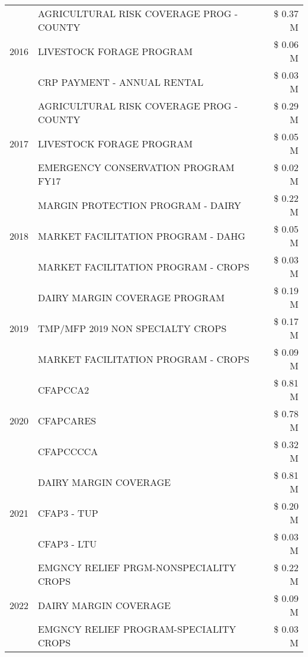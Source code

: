 \begin{tabular}{llr}
\cline{1-3}
\multirow[t]{3}{*}{2016} & AGRICULTURAL RISK COVERAGE PROG - COUNTY & \$ 0.37 M \\
 & LIVESTOCK FORAGE PROGRAM & \$ 0.06 M \\
 & CRP PAYMENT - ANNUAL RENTAL & \$ 0.03 M \\
\cline{1-3}
\multirow[t]{3}{*}{2017} & AGRICULTURAL RISK COVERAGE PROG - COUNTY & \$ 0.29 M \\
 & LIVESTOCK FORAGE PROGRAM & \$ 0.05 M \\
 & EMERGENCY CONSERVATION PROGRAM FY17 & \$ 0.02 M \\
\cline{1-3}
\multirow[t]{3}{*}{2018} & MARGIN PROTECTION PROGRAM - DAIRY & \$ 0.22 M \\
 & MARKET FACILITATION PROGRAM - DAHG & \$ 0.05 M \\
 & MARKET FACILITATION PROGRAM - CROPS & \$ 0.03 M \\
\cline{1-3}
\multirow[t]{3}{*}{2019} & DAIRY MARGIN COVERAGE PROGRAM & \$ 0.19 M \\
 & TMP/MFP 2019 NON SPECIALTY CROPS & \$ 0.17 M \\
 & MARKET FACILITATION PROGRAM - CROPS & \$ 0.09 M \\
\cline{1-3}
\multirow[t]{3}{*}{2020} & CFAPCCA2 & \$ 0.81 M \\
 & CFAPCARES & \$ 0.78 M \\
 & CFAPCCCCA & \$ 0.32 M \\
\cline{1-3}
\multirow[t]{3}{*}{2021} & DAIRY MARGIN COVERAGE & \$ 0.81 M \\
 & CFAP3 - TUP & \$ 0.20 M \\
 & CFAP3 - LTU & \$ 0.03 M \\
\cline{1-3}
\multirow[t]{3}{*}{2022} & EMGNCY RELIEF PRGM-NONSPECIALITY CROPS & \$ 0.22 M \\
 & DAIRY MARGIN COVERAGE & \$ 0.09 M \\
 & EMGNCY RELIEF PROGRAM-SPECIALITY CROPS & \$ 0.03 M \\
\cline{1-3}
\bottomrule
\end{tabular}
